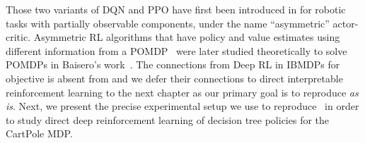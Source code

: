 Those two variants of DQN and PPO have first been introduced in \cite{pinto} for robotic tasks with partially observable components, under the name ``asymmetric'' actor-critic. 
Asymmetric RL algorithms that have policy and value estimates using different information from a POMDP~\cite{POMDP,chap2} were later studied theoretically to solve POMDPs in Baisero's work~\cite{baisero-dqn,baisero-ppo}.
The connections from Deep RL in IBMDPs for objective is absent from \cite{topin2021iterative} and we defer their connections to direct interpretable reinforcement learning to the next chapter as our primary goal is to reproduce \cite{topin2021iterative} \textit{as is}.
Next, we present the precise experimental setup we use to reproduce~\cite[table 1]{topin2021iterative} in order to study direct deep reinforcement learning of decision tree policies for the CartPole MDP.

